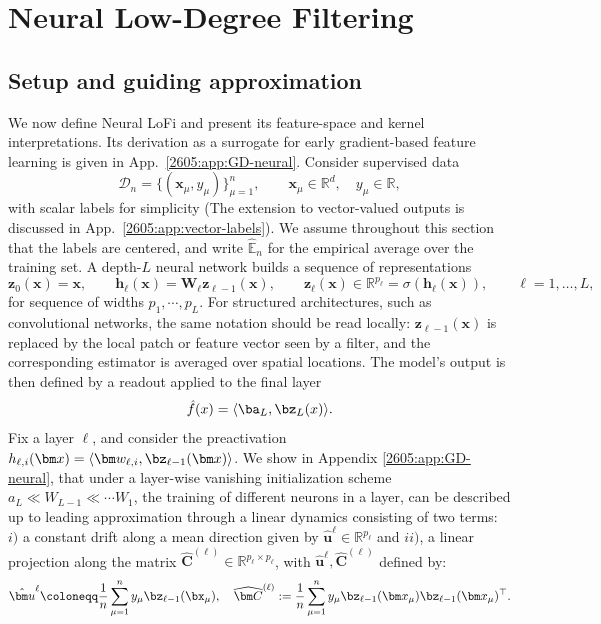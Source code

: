 \section{Neural Low-Degree Filtering}

\label{2605:sec:neural-lofi}

\subsection{Setup and guiding approximation}
We now define Neural LoFi and present its feature-space and kernel interpretations. Its derivation as a surrogate for early gradient-based feature learning is given in App.~\ref{2605:app:GD-neural}. Consider supervised data
\[
    \mathcal D_n=\{(\bm x_\mu,y_\mu)\}_{\mu=1}^n,
    \qquad
    \bm x_\mu\in\mathbb R^d,\quad y_\mu\in\mathbb R,
\]
with scalar labels for simplicity (The extension to vector-valued outputs is discussed in App.~\ref{2605:app:vector-labels}).  We assume throughout this section that the labels are centered, and write
\(\widehat{\mathbb E}_n\) for the empirical average over the training set.  A depth-\(L\) neural network builds a sequence of representations
\begin{equation}
    \bm z_0(\bm x)=\bm x,
    \qquad
    \bm h_\ell(\bm x)
    =
    \bm W_\ell \bm z_{\ell-1}(\bm x),
    \qquad
    \bm z_\ell(\bm x) \in \mathbb{R}^{p_\ell}
    =
    \sigma(\bm h_\ell(\bm x)),
    \qquad
    \ell=1,\dots,L,
    \label{2605:eq:standard-network}
\end{equation}
for sequence of widths $p_1,\cdots, p_L$. For structured architectures, such as convolutional networks, the same notation should be read locally: \({\bm z}_{\ell-1}(\bm x)\) is replaced by the local patch or feature vector seen by a filter, and the corresponding estimator is averaged over spatial locations.
The model's output is then defined by a readout applied to the final layer 
\begin{equation}
    \hat f(x)= \langle \ba_L,\bz_L(x)\rangle.
\end{equation}
Fix a layer \(\ell\), and consider the preactivation
$
    h_{\ell,i}(\bm x)
    =
    \langle \bm w_{\ell,i},\bz_{\ell-1}(\bm x)\rangle 
$. We show  in Appendix \ref{2605:app:GD-neural}, that under a layer-wise vanishing initialization scheme $a_{L} \ll W_{L-1} \ll \cdots W_1$, the training of different neurons in a layer, can be described up to leading approximation through a linear dynamics consisting of two terms: $i)$ a constant drift along a mean direction given by $\hat{\bm u}^\ell \in \mathbb{R}^{p_{\ell}}$
 and $ii)$, a linear projection along the matrix $\widehat{\bm C}^{(\ell)}  \in \mathbb{R}^{p_{\ell} \times p_{\ell}}$, with $\hat{\bm u}^\ell,  \widehat{\bm C}^{(\ell)}$ defined by:
 \begin{equation}\label{2605:eq:lofi-main-operator}
    \hat{\bm u}^\ell \coloneqq \frac{1}{n}\sum_{\mu=1}^n y_{\mu} \bz_{\ell-1}(\bx_\mu) , \quad 
    \widehat{\bm C}^{(\ell)}
    :=
    \frac1n
    \sum_{\mu=1}^n
    y_\mu 
    \bz_{\ell-1}(\bm x_\mu)
    {\bz}_{\ell-1}(\bm x_\mu)^\top .
\end{equation}

